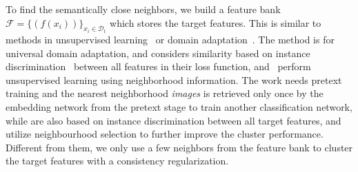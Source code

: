\documentclass[10pt,twocolumn,letterpaper]{article}
\begin{document}
To find the semantically close neighbors, we build a feature bank $\mathcal{F}=\{(f(x_i))\}_{x_i \in \mathcal{D}_t}$ which stores the target features. This is similar to methods in unsupervised learning~\cite{wu2018unsupervised,huang2019unsupervised,zhuang2019local,van2020scan} or domain adaptation~\cite{saito2020universal}. The method \cite{saito2020universal} is for universal domain adaptation, and considers similarity based on instance discrimination~\cite{wu2018unsupervised} between all features in their loss function, and~\cite{huang2019unsupervised,van2020scan,zhuang2019local} perform unsupervised learning using neighborhood information. The work \cite{van2020scan} needs pretext training and the nearest neighborhood \textit{images} is retrieved only once by the embedding network from the pretext stage to train another classification network, while \cite{huang2019unsupervised,zhuang2019local} are also based on instance discrimination between all target features, and utilize neighbourhood selection to further improve the cluster performance. Different from them, we only use a few neighbors from the feature bank to cluster the target features with a consistency regularization.
\end{document}
